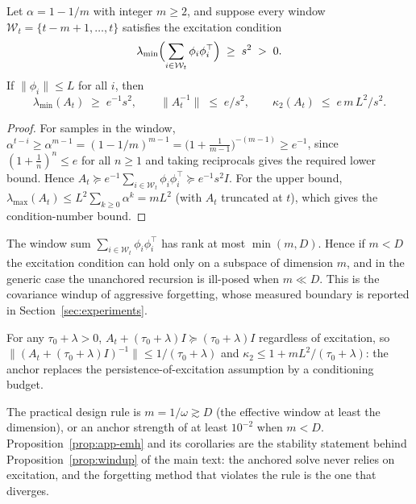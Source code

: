 \begin{proposition}
\label{prop:app-emh}
Let $\alpha = 1 - 1/m$ with integer $m \ge 2$, and suppose every window $\mathcal W_t = \{t - m + 1, \dots, t\}$ satisfies the excitation condition
\[
  \lambda_{\min}\Bigl(\sum_{i \in \mathcal W_t} \phi_i \phi_i^\top\Bigr) \;\ge\; s^2 \;>\; 0 .
\]
If $\|\phi_i\| \le L$ for all $i$, then
\[
  \lambda_{\min}(A_t) \;\ge\; e^{-1} s^2,
  \qquad
  \|A_t^{-1}\| \;\le\; e/s^2,
  \qquad
  \kappa_2(A_t) \;\le\; e\,m\,L^2/s^2 .
\]
\end{proposition}
\begin{proof}
For samples in the window, $\alpha^{t-i} \ge \alpha^{m-1} = (1 - 1/m)^{m-1} = \bigl(1 + \tfrac{1}{m-1}\bigr)^{-(m-1)} \ge e^{-1}$, since $(1 + \tfrac1n)^n \le e$ for all $n \ge 1$ and taking reciprocals gives the required lower bound.
Hence $A_t \succeq e^{-1} \sum_{i \in \mathcal W_t} \phi_i\phi_i^\top \succeq e^{-1} s^2 I$.
For the upper bound, $\lambda_{\max}(A_t) \le L^2 \sum_{k \ge 0} \alpha^k = mL^2$ (with $A_t$ truncated at $t$), which gives the condition-number bound.
\end{proof}

\begin{corollary}
\label{cor:app-rank}
The window sum $\sum_{i \in \mathcal W_t} \phi_i\phi_i^\top$ has rank at most $\min(m, D)$.
Hence if $m < D$ the excitation condition can hold only on a subspace of dimension $m$, and in the generic case the unanchored recursion is ill-posed when $m \ll D$.
This is the covariance windup of aggressive forgetting, whose measured boundary is reported in Section~\ref{sec:experiments}.
\end{corollary}

\begin{corollary}
\label{cor:app-anchor-excites}
For any $\tau_0 + \lambda > 0$,
$A_t + (\tau_0 + \lambda)I \succeq (\tau_0 + \lambda)I$ regardless of excitation, so
$\|(A_t + (\tau_0 + \lambda)I)^{-1}\| \le 1/(\tau_0 + \lambda)$ and
$\kappa_2 \le 1 + mL^2/(\tau_0 + \lambda)$: the anchor replaces the persistence-of-excitation assumption by a conditioning budget.
\end{corollary}

The practical design rule is $m = 1/\omega \gtrsim D$ (the effective window at least the dimension), or an anchor strength of at least $10^{-2}$ when $m < D$.
Proposition~\ref{prop:app-emh} and its corollaries are the stability statement behind Proposition~\ref{prop:windup} of the main text: the anchored solve never relies on excitation, and the forgetting method that violates the rule is the one that diverges.

